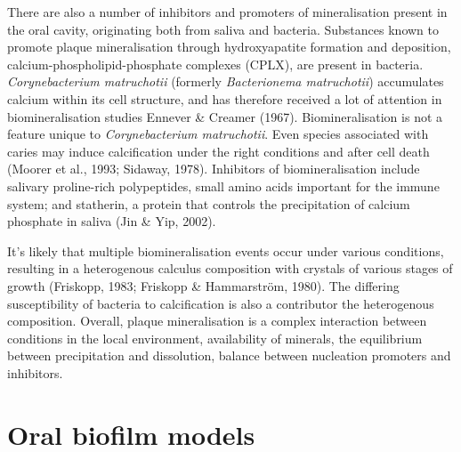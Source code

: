 \documentclass[
  letterpaper,
]{book}
\begin{document}
There are also a number of inhibitors and promoters of mineralisation
present in the oral cavity, originating both from saliva and bacteria.
Substances known to promote plaque mineralisation through hydroxyapatite
formation and deposition, calcium-phospholipid-phosphate complexes
(CPLX), are present in bacteria. \emph{Corynebacterium matruchotii}
(formerly \emph{Bacterionema matruchotii}) accumulates calcium within
its cell structure, and has therefore received a lot of attention in
biomineralisation studies Ennever \& Creamer (1967). Biomineralisation
is not a feature unique to \emph{Corynebacterium matruchotii}. Even
species associated with caries may induce calcification under the right
conditions and after cell death (Moorer et al., 1993; Sidaway, 1978).
Inhibitors of biomineralisation include salivary proline-rich
polypeptides, small amino acids important for the immune system; and
statherin, a protein that controls the precipitation of calcium
phosphate in saliva (Jin \& Yip, 2002).

It's likely that multiple biomineralisation events occur under various
conditions, resulting in a heterogenous calculus composition with
crystals of various stages of growth (Friskopp, 1983; Friskopp \&
Hammarström, 1980). The differing susceptibility of bacteria to
calcification is also a contributor the heterogenous composition.
Overall, plaque mineralisation is a complex interaction between
conditions in the local environment, availability of minerals, the
equilibrium between precipitation and dissolution, balance between
nucleation promoters and inhibitors.

\hypertarget{oral-biofilm-models}{%
\section{Oral biofilm models}\label{oral-biofilm-models}}
\end{document}
